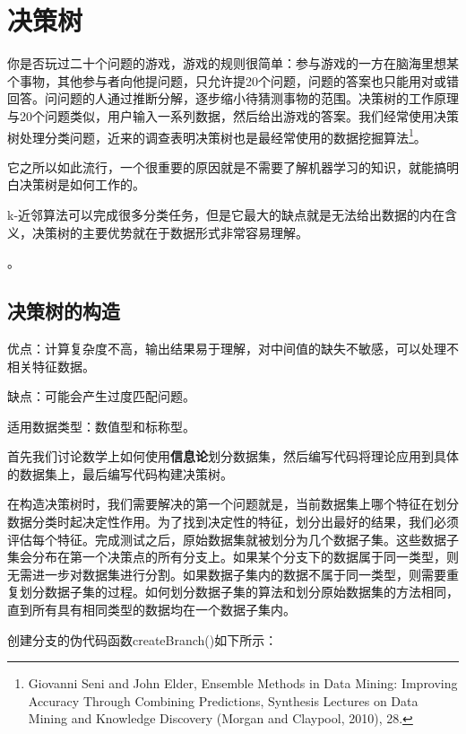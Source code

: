 \chapter{决策树\label{chapter03}}
你是否玩过二十个问题的游戏，游戏的规则很简单：参与游戏的一方在脑海里想某个事物，其他参与者向他提问题，只允许提20个问题，问题的答案也只能用对或错回答。问问题的人通过推断分解，逐步缩小待猜测事物的范围。决策树的工作原理与20个问题类似，用户输入一系列数据，然后给出游戏的答案。我们经常使用决策树处理分类问题，近来的调查表明决策树也是最经常使用的数据挖掘算法\footnote{Giovanni Seni and John Elder, Ensemble Methods in Data Mining: Improving Accuracy Through Combining Predictions, Synthesis Lectures on Data Mining and Knowledge Discovery (Morgan and Claypool, 2010), 28.}。

它之所以如此流行，一个很重要的原因就是不需要了解机器学习的知识，就能搞明白决策树是如何工作的。

k-近邻算法可以完成很多分类任务，但是它最大的缺点就是无法给出数据的内在含义，决策树的主要优势就在于数据形式非常容易理解。

。
\section{决策树的构造}
\begin{tcolorbox}[title=决策树]
    优点：计算复杂度不高，输出结果易于理解，对中间值的缺失不敏感，可以处理不相关特征数据。

    缺点：可能会产生过度匹配问题。

    适用数据类型：数值型和标称型。
\end{tcolorbox}

首先我们讨论数学上如何使用\textbf{信息论}划分数据集，然后编写代码将理论应用到具体的数据集上，最后编写代码构建决策树。

在构造决策树时，我们需要解决的第一个问题就是，当前数据集上哪个特征在划分数据分类时起决定性作用。为了找到决定性的特征，划分出最好的结果，我们必须评估每个特征。完成测试之后，原始数据集就被划分为几个数据子集。这些数据子集会分布在第一个决策点的所有分支上。如果某个分支下的数据属于同一类型，则无需进一步对数据集进行分割。如果数据子集内的数据不属于同一类型，则需要重复划分数据子集的过程。如何划分数据子集的算法和划分原始数据集的方法相同，直到所有具有相同类型的数据均在一个数据子集内。

创建分支的伪代码函数createBranch()如下所示：
\begin{algorithm}
    \caption{决策树分支判断}
\end{algorithm}

